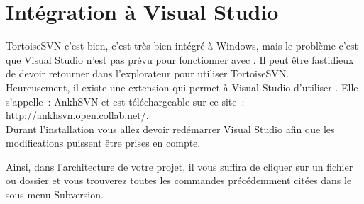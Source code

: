 \chapter{Intégration à Visual Studio}

TortoiseSVN c'est bien, c'est très bien intégré à Windows, mais le problème c'est que Visual Studio n'est pas prévu pour fonctionner avec \svn. Il peut être fastidieux de devoir retourner dans l'explorateur pour utiliser TortoiseSVN.\\

Heureusement, il existe une extension qui permet à Visual Studio d'utiliser \svn. Elle s'appelle~: AnkhSVN et est téléchargeable sur ce site~: \url{http://ankhsvn.open.collab.net/}.\\

Durant l'installation vous allez devoir redémarrer Visual Studio afin que les modifications puissent être prises en compte.

Ainsi, dans l’architecture de votre projet, il vous suffira de cliquer sur un fichier ou dossier et vous trouverez toutes les commandes précédemment citées dans le sous-menu Subversion.